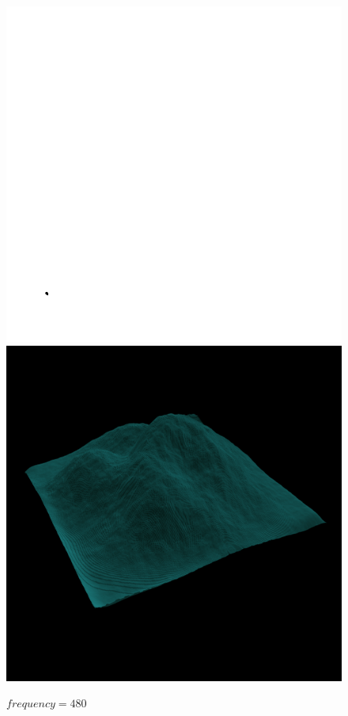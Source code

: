    		\begin{figure}[H]
   			\centering
   			\includegraphics[width=\imagewidth]{images/results/terrains/512-1/perlin/480}
   			\includegraphics[width=\imagewidth]{images/results/terrains/512-1/perlin/480_3d}
  			\caption{$frequency = 480$}
   			\label{fig:ex-perlin480-surface}
   		\end{figure}
    
